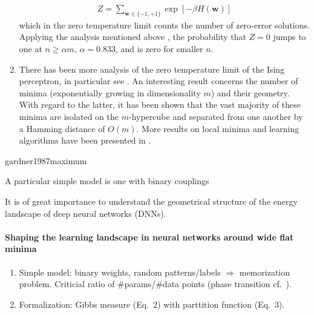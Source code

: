 \documentclass[10pt,a4pape]{article}
\newcommand{\w}{{\mathbf w}}
\begin{document}
\begin{enumerate}
\begin{align}
Z  = \sum_{\w \in \{-1,+1\}} \exp\left[-\beta H(\w) \right]
\end{align} 
which in the zero temperature limit counts the number of zero-error solutions. Applying the analysis mentioned above \cite{krauth1989storage,ding2018capacity}, the probability that $Z =0$ jumps to one at $n  \ge \alpha m$, $\alpha = 0.833$, and is zero for smaller $n$.
%
\item There has been more analysis of the zero temperature limit of the Ising perceptron, in particular see \cite{huang2014origin}. An interesting result concerns the number of minima (exponentially growing in dimensionality $m$) and their geometry. With regard to the latter, it has been shown that the vast majority of these minima are isolated on the $m$-hypercube and separated from one another by a Hamming distance of $O(m)$. More results on local minima and learning algorithms have been presented in \cite{horner1992dynamics,braunstein2006learning, baldassi2007efficient, baldassi2009generalization}.
\end{enumerate}


\newpage




\newpage


gardner1987maximum

A particular simple model is one with binary couplings 



It is of great importance to understand the geometrical structure of the energy landscape of deep neural networks (DNNs). 


\paragraph{Shaping the learning landscape in neural networks around wide flat
  minima \cite{baldassi2019shaping}}

\begin{enumerate}
\item Simple model: binary weights, random patterns/labels $\Rightarrow$ memorization problem. Criticial ratio of \#params/\#data points (phase transition cf.~\cite{krauth1989storage}). 
\item Formalization: Gibbs measure (Eq.~2) with parttition function (Eq.~3).
\end{enumerate}




\end{document}
